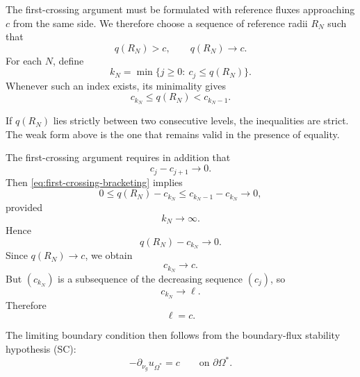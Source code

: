 \documentclass[11pt,a4paper]{article}
\theoremstyle{definition}
\theoremstyle{remark}
\begin{document}
The first-crossing argument must be formulated with reference fluxes
approaching $c$ from the same side. We therefore choose a sequence of
reference radii $R_N$ such that
\begin{equation}
q(R_N)>c,
\qquad
q(R_N)\longrightarrow c.
\label{eq:qRN-from-above}
\end{equation}
For each $N$, define
\begin{equation}
k_N
=
\min\{j\geq0:\ c_j\leq q(R_N)\}.
\label{eq:riemannian-stopping-index-final}
\end{equation}
Whenever such an index exists, its minimality gives
\begin{equation}
c_{k_N}\leq q(R_N)<c_{k_N-1}.
\label{eq:first-crossing-bracketing}
\end{equation}

If $q(R_N)$ lies strictly between two consecutive levels, the
inequalities are strict. The weak form above is the one that remains
valid in the presence of equality.

The first-crossing argument requires in addition that
\begin{equation}
c_j-c_{j+1}\longrightarrow0.
\label{eq:successive-level-gap-final}
\end{equation}
Then \eqref{eq:first-crossing-bracketing} implies
\begin{equation}
0\leq q(R_N)-c_{k_N}
\leq
c_{k_N-1}-c_{k_N}
\longrightarrow0,
\label{eq:stopping-gap}
\end{equation}
provided
\[
k_N\longrightarrow\infty.
\]
Hence
\begin{equation}
q(R_N)-c_{k_N}\longrightarrow0.
\label{eq:qRN-cK}
\end{equation}
Since $q(R_N)\to c$, we obtain
\begin{equation}
c_{k_N}\longrightarrow c.
\label{eq:stopping-level-to-c}
\end{equation}
But $(c_{k_N})$ is a subsequence of the decreasing sequence
$(c_j)$, so
\[
c_{k_N}\longrightarrow\ell.
\]
Therefore
\begin{equation}
\ell=c.
\label{eq:ell-equals-c}
\end{equation}

The limiting boundary condition then follows from the boundary-flux
stability hypothesis (SC):
\begin{equation}
-\partial_{\nu_g}u_{\Omega^\ast}
=
c
\qquad\text{on }\partial\Omega^\ast.
\label{eq:exact-riemannian-bernoulli-level}
\end{equation}
\end{document}
